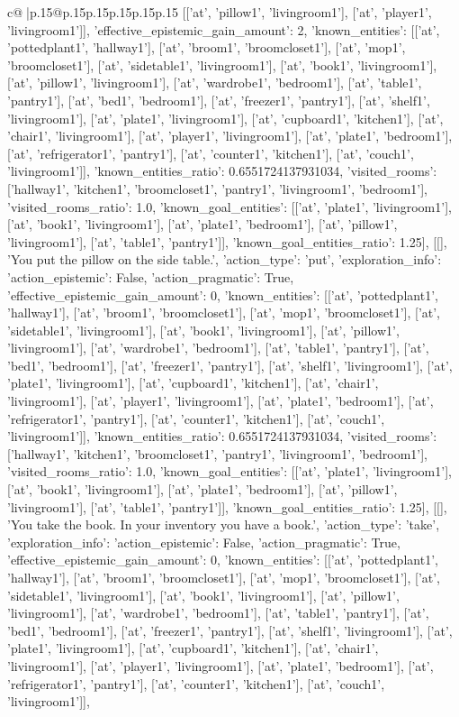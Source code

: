 \documentclass{article}
\begin{document}
{\begin{supertabular}{c@{$\;$}|p{.15\linewidth}@{}p{.15\linewidth}p{.15\linewidth}p{.15\linewidth}p{.15\linewidth}p{.15\linewidth}}
{{{[['at', 'pillow1', 'livingroom1'], ['at', 'player1', 'livingroom1']], 'effective_epistemic_gain_amount': 2, 'known_entities': [['at', 'pottedplant1', 'hallway1'], ['at', 'broom1', 'broomcloset1'], ['at', 'mop1', 'broomcloset1'], ['at', 'sidetable1', 'livingroom1'], ['at', 'book1', 'livingroom1'], ['at', 'pillow1', 'livingroom1'], ['at', 'wardrobe1', 'bedroom1'], ['at', 'table1', 'pantry1'], ['at', 'bed1', 'bedroom1'], ['at', 'freezer1', 'pantry1'], ['at', 'shelf1', 'livingroom1'], ['at', 'plate1', 'livingroom1'], ['at', 'cupboard1', 'kitchen1'], ['at', 'chair1', 'livingroom1'], ['at', 'player1', 'livingroom1'], ['at', 'plate1', 'bedroom1'], ['at', 'refrigerator1', 'pantry1'], ['at', 'counter1', 'kitchen1'], ['at', 'couch1', 'livingroom1']], 'known_entities_ratio': 0.6551724137931034, 'visited_rooms': ['hallway1', 'kitchen1', 'broomcloset1', 'pantry1', 'livingroom1', 'bedroom1'], 'visited_rooms_ratio': 1.0, 'known_goal_entities': [['at', 'plate1', 'livingroom1'], ['at', 'book1', 'livingroom1'], ['at', 'plate1', 'bedroom1'], ['at', 'pillow1', 'livingroom1'], ['at', 'table1', 'pantry1']], 'known_goal_entities_ratio': 1.25}}], [[], 'You put the pillow on the side table.', {'action_type': 'put', 'exploration_info': {'action_epistemic': False, 'action_pragmatic': True, 'effective_epistemic_gain_amount': 0, 'known_entities': [['at', 'pottedplant1', 'hallway1'], ['at', 'broom1', 'broomcloset1'], ['at', 'mop1', 'broomcloset1'], ['at', 'sidetable1', 'livingroom1'], ['at', 'book1', 'livingroom1'], ['at', 'pillow1', 'livingroom1'], ['at', 'wardrobe1', 'bedroom1'], ['at', 'table1', 'pantry1'], ['at', 'bed1', 'bedroom1'], ['at', 'freezer1', 'pantry1'], ['at', 'shelf1', 'livingroom1'], ['at', 'plate1', 'livingroom1'], ['at', 'cupboard1', 'kitchen1'], ['at', 'chair1', 'livingroom1'], ['at', 'player1', 'livingroom1'], ['at', 'plate1', 'bedroom1'], ['at', 'refrigerator1', 'pantry1'], ['at', 'counter1', 'kitchen1'], ['at', 'couch1', 'livingroom1']], 'known_entities_ratio': 0.6551724137931034, 'visited_rooms': ['hallway1', 'kitchen1', 'broomcloset1', 'pantry1', 'livingroom1', 'bedroom1'], 'visited_rooms_ratio': 1.0, 'known_goal_entities': [['at', 'plate1', 'livingroom1'], ['at', 'book1', 'livingroom1'], ['at', 'plate1', 'bedroom1'], ['at', 'pillow1', 'livingroom1'], ['at', 'table1', 'pantry1']], 'known_goal_entities_ratio': 1.25}}], [[], 'You take the book. In your inventory you have a book.', {'action_type': 'take', 'exploration_info': {'action_epistemic': False, 'action_pragmatic': True, 'effective_epistemic_gain_amount': 0, 'known_entities': [['at', 'pottedplant1', 'hallway1'], ['at', 'broom1', 'broomcloset1'], ['at', 'mop1', 'broomcloset1'], ['at', 'sidetable1', 'livingroom1'], ['at', 'book1', 'livingroom1'], ['at', 'pillow1', 'livingroom1'], ['at', 'wardrobe1', 'bedroom1'], ['at', 'table1', 'pantry1'], ['at', 'bed1', 'bedroom1'], ['at', 'freezer1', 'pantry1'], ['at', 'shelf1', 'livingroom1'], ['at', 'plate1', 'livingroom1'], ['at', 'cupboard1', 'kitchen1'], ['at', 'chair1', 'livingroom1'], ['at', 'player1', 'livingroom1'], ['at', 'plate1', 'bedroom1'], ['at', 'refrigerator1', 'pantry1'], ['at', 'counter1', 'kitchen1'], ['at', 'couch1', 'livingroom1']], }}}
\end{supertabular}}
\end{document}
